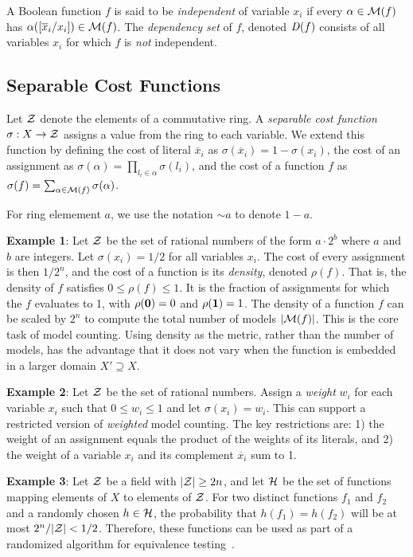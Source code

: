 \documentclass{llncs}
\newcommand{\one}{\mbox{\bf 1}}
\newcommand{\zero}{\mbox{\bf 0}}
\newcommand{\obar}[1]{\overline{#1}}
\newcommand{\oneminus}{{\sim}}
\newcommand{\interp}{\alpha}
\newcommand{\interpset}[1]{{\cal M}(#1)}
\newcommand{\ring}{{\cal Z}}
\newcommand{\cost}{\sigma}
\newcommand{\density}{\rho}
\newcommand{\hashset}{{\cal H}}
\newcommand{\fhash}{h}
\newcommand{\depend}{{\it D}}
\newcommand{\subs}[2]{[#2/#1]}
\begin{document}
A Boolean function $f$ is said to be {\em independent} of variable
$x_i$ if every $\interp \in \interpset{f}$ has $\interp(\subs{x_i}{\obar{x}_i})
\in \interpset{f}$.  The {\em dependency set} of $f$, denoted
$\depend(f)$ consists of all variables $x_i$ for which $f$ is {\em
  not} independent.

\subsection{Separable Cost Functions}

Let $\ring$ denote the elements of a commutative ring.  A {\em
  separable cost function} $\cost:X \rightarrow \ring$ assigns a value
from the ring to each variable.  We extend this function by defining
the cost of literal $\obar{x}_i$ as $\cost(\obar{x}_i) = 1 - \cost(x_i)$, the cost
of an assignment as $\cost(\interp) = \prod_{l_i \in \interp}
\cost(l_i)$, and the cost of a function $f$ as $\cost(f) =
\sum_{\interp \in \interpset{f}} \cost(\interp)$.

For ring elemement $a$, we use the notation $\oneminus a$ to denote $1 - a$.

{\bf Example 1}: Let $\ring$ be the set of rational numbers of the form $a\cdot 2^b$ where $a$ and $b$ are integers.
Let $\cost(x_i) = 1/2$ for all variables $x_i$.  The cost of every
assignment is then $1/2^{n}$, and the cost of a function is its
{\em density}, denoted $\density(f)$.  That is, the density of $f$ satisfies
$0 \leq \density(f) \leq 1$.  It
is the fraction of assignments for which the $f$
evaluates to 1, with $\density(\zero) = 0$ and $\density(\one) = 1$.  The density of a function
$f$ can be scaled by $2^n$ to compute the total number of models
$|\interpset{f}|$.  This is the core task of model counting.  Using
density as the metric, rather than the number of models, has the advantage that it does not vary when the
function is embedded in a larger domain $X' \supseteq X$.  

{\bf Example 2}: Let $\ring$ be the set of rational numbers.  Assign a
{\em weight} $w_i$ for each variable $x_i$ such that $0 \leq w_i \leq
1$ and let $\cost(x_i) = w_i$.  This can support a restricted version of
{\em weighted} model counting.  The key restrictions are: 1) the
weight of an assignment equals the product of the weights of its
literals, and 2) the weight of a variable $x_i$ and its complement
$\obar{x}_i$ sum to 1.


{\bf Example 3}: Let $\ring$ be a field with $|\ring| \geq 2n$,
and let $\hashset$ be the set of functions
mapping elements of $X$ to elements of $\ring$.  For
two distinct functions $f_1$ and $f_2$ and a randomly chosen $\fhash
\in \hashset$, the probability that $h(f_1) = h(f_2)$ will be at most
$2^n/|\ring|< 1/2$.  Therefore, these functions can be used as part of a
randomized algorithm for equivalence testing~\cite{blum:ipl:1980}.
\end{document}
